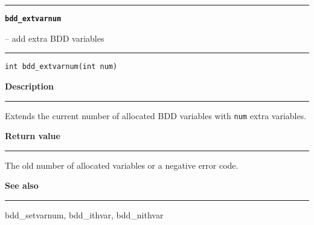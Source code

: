 \begin{minipage}{\textwidth}

\noindent\begin{minipage}{\textwidth}
\rule{\textwidth}{0.5mm}
{\tt\bf bdd\_extvarnum }
\--- add extra BDD variables  \hspace{\fill}
\\\rule[1.5ex]{\textwidth}{0.5mm}
\end{minipage}

\noindent\begin{verbatim}
int bdd_extvarnum(int num) 
\end{verbatim}

\vspace{\parsep}\noindent
{\bf Description}\\\rule[1.5ex]{\textwidth}{0.2mm}\vspace{-1.5ex}\setlength{\parindent}{1em}
Extends the current number of allocated BDD variables with
           {\tt num} extra variables. 

\setlength{\parindent}{0em}\vspace{\parsep}\vspace{\baselineskip}\noindent
{\bf Return value}\\\rule[1.5ex]{\textwidth}{0.2mm}\vspace{-1.5ex}
The old number of allocated variables or a negative error code. 

\vspace{\parsep}\vspace{\baselineskip}\noindent
{\bf See also}\\\rule[1.5ex]{\textwidth}{0.2mm}\vspace{-1.5ex}
bdd\_setvarnum, bdd\_ithvar, bdd\_nithvar 
\end{minipage}
\vspace{8ex}

